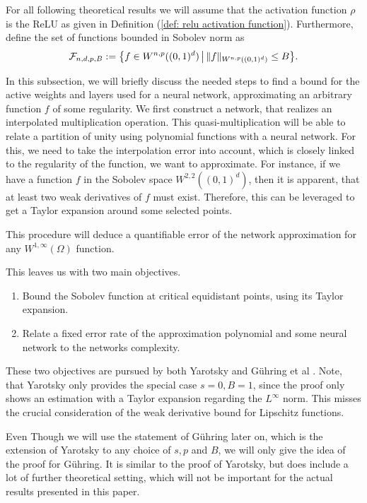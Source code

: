 For all following theoretical results we will assume that the activation function $\rho$ is the ReLU as given
in Definition (\ref{def: relu activation function}). Furthermore, define the set of functions bounded in Sobolev norm as
\begin{equation*}
    \Fcal_{n,d,p,B} := \big\{ f \in W^{n,p}((0,1)^d) \, \big\vert \, \snorm{f}[n][p][d] \leq B \big\}.
\end{equation*}

In this subsection, we will briefly discuss the needed steps to 
find a bound for the active weights and layers used for a neural network, approximating an arbitrary
function $f$ of some regularity. We first construct a network, that realizes an interpolated multiplication
operation. This quasi-multiplication will be able to relate a partition of unity using polynomial functions
with a neural network. For this, we need to
take the interpolation error into account, which is closely linked to the regularity of the function, we want
to approximate. For instance, if we have a
function $f$ in the Sobolev space $W^{2, 2}((0,1)^d)$, then it is apparent, that at least two weak derivatives of $f$ must exist.
Therefore, this can be leveraged to get a Taylor expansion around some selected points.

This procedure will deduce a quantifiable error of the network approximation for any $W^{1, \infty}(\Omega)$ function.

This leaves us with two main objectives.
\begin{enumerate}
    \item Bound the Sobolev function at critical equidistant points, using its Taylor expansion.
    \item Relate a fixed error rate of the approximation polynomial and some neural network to the networks complexity.
\end{enumerate}

These two objectives are pursued by both Yarotsky \cite{yarotsky2017nn} and Gühring et al \cite{gühring2019nn}.
Note, that Yarotsky
only provides the special case $s=0, B=1$, since the proof only shows an estimation with a Taylor expansion
regarding the $L^\infty$ norm. This misses the crucial consideration of the weak derivative bound for Lipschitz functions.


Even Though we will use the statement of
Gühring later on, which is the extension of Yarotsky to any choice of $s, p$ and $B$, 
we will only give the idea of 
the proof for Gühring. It is similar to the proof of Yarotsky, but does include a lot of further 
theoretical setting, which will not be important for the actual results presented in this paper.

